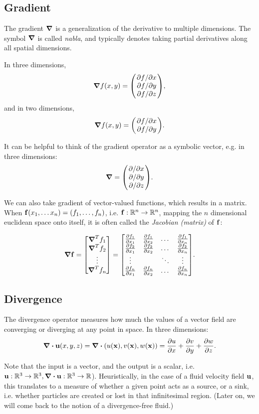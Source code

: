 \subsection*{Gradient}
The gradient $\grad$ is a generalization of the derivative to multiple
dimensions. The symbol $\grad$ is called \textit{nabla}, and typically denotes
taking partial derivatives along all spatial dimensions. 

In three dimensions, 
$$\grad f(x,y) = \mqty(\pdv*{f}{x} \\ \pdv*{f}{y} \\ \pdv*{f}{z}),$$ 
and in two dimensions,
$$\grad f(x,y) = \mqty(\pdv*{f}{x} \\ \pdv*{f}{y}).$$

It can be helpful to think of the gradient operator as a symbolic
vector, e.g. in three dimensions:
$$\grad = \mqty(\pdv*{x} \\ \pdv*{y} \\ \pdv*{z}).$$ 

We can also take gradient of vector-valued functions, which results in a matrix.
When $\vb{f}(x_1,\dots x_n) = (f_1, \dots, f_n)$, i.e. $\vb{f}: \mathbb{R}^n \to
\mathbb{R}^n$, mapping the $n$ dimensional euclidean space onto itself, it is
often called the \textit{Jacobian (matrix)} of $\vb{f}$:

$$\grad \vb{f} = \mqty[\grad^T{f_1}\\\grad^T{f_2}\\\vdots\\\grad^T f_n] = 
\mqty[
\pdv{f_1}{x_1} & \pdv{f_1}{x_2} & \dots & \pdv{f_1}{x_n}\\
\pdv{f_2}{x_1} & \pdv{f_2}{x_2} & \dots & \pdv{f_2}{x_n}\\
\vdots         &                & \ddots & \vdots \\
\pdv{f_n}{x_1} & \pdv{f_n}{x_2} & \dots & \pdv{f_n}{x_n}
].$$

\subsection*{Divergence}
The divergence operator measures how much the values of a vector field are
converging or diverging at any point in space. In three dimensions:
$$\div{\vb{u}(x,y,z)} = \div(u(\vb{x}), v(\vb{x}), w(\vb{x})) = 
\pdv{u}{x}+\pdv{v}{y}+\pdv{w}{z}.$$

Note that the input is a vector, and the output is a scalar, i.e. $\vb{u}:
\mathbb{R}^3 \to \mathbb{R}^3, \div{\vb{u}}: \mathbb{R}^3\to\mathbb{R}$).
Heuristically, in the case of a fluid velocity field $\vb{u}$, this translates
to a measure of whether a given point acts as a source, or a sink, i.e. whether
particles are created or lost in that infinitesimal region. (Later on, we will
come back to the notion of a divergence-free fluid.)

